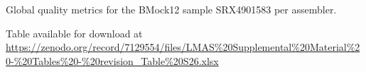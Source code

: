 \begin{table}[]
\centering
\caption{ Global quality metrics  for the BMock12 sample SRX4901583 per assembler.}
\label{tab:ch5_suptable26}
Table available for download at \url{https://zenodo.org/record/7129554/files/LMAS\%20Supplemental\%20Material\%20-\%20Tables\%20-\%20revision_Table\%20S26.xlsx}
\end{table}